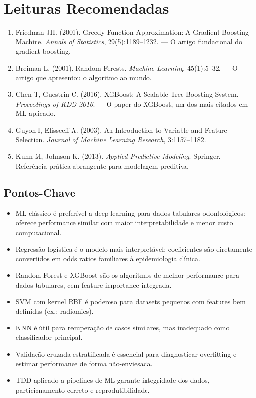 

\section{Leituras Recomendadas}
\begin{enumerate}
    \item Friedman JH. (2001). Greedy Function Approximation: A Gradient Boosting Machine. \textit{Annals of Statistics}, 29(5):1189--1232. — O artigo fundacional do gradient boosting.
    \item Breiman L. (2001). Random Forests. \textit{Machine Learning}, 45(1):5--32. — O artigo que apresentou o algoritmo ao mundo.
    \item Chen T, Guestrin C. (2016). XGBoost: A Scalable Tree Boosting System. \textit{Proceedings of KDD 2016}. — O paper do XGBoost, um dos mais citados em ML aplicado.
    \item Guyon I, Elisseeff A. (2003). An Introduction to Variable and Feature Selection. \textit{Journal of Machine Learning Research}, 3:1157--1182.
    \item Kuhn M, Johnson K. (2013). \textit{Applied Predictive Modeling}. Springer. — Referência prática abrangente para modelagem preditiva.
\end{enumerate}

\subsection{Pontos-Chave}
\begin{itemize}
    \item ML clássico é preferível a deep learning para dados tabulares odontológicos: oferece performance similar com maior interpretabilidade e menor custo computacional.
    \item Regressão logística é o modelo mais interpretável: coeficientes são diretamente convertidos em odds ratios familiares à epidemiologia clínica.
    \item Random Forest e XGBoost são os algoritmos de melhor performance para dados tabulares, com feature importance integrada.
    \item SVM com kernel RBF é poderoso para datasets pequenos com features bem definidas (ex.: radiomics).
    \item KNN é útil para recuperação de casos similares, mas inadequado como classificador principal.
    \item Validação cruzada estratificada é essencial para diagnosticar overfitting e estimar performance de forma não-enviesada.
    \item TDD aplicado a pipelines de ML garante integridade dos dados, particionamento correto e reprodutibilidade.
\end{itemize}

